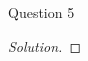 \begin{solution}{Question 5}\label{ques:5}
    \begin{question}
    \end{question}
    \tcblower{}
    \begin{proof}[Solution]
    \end{proof}
\end{solution}
